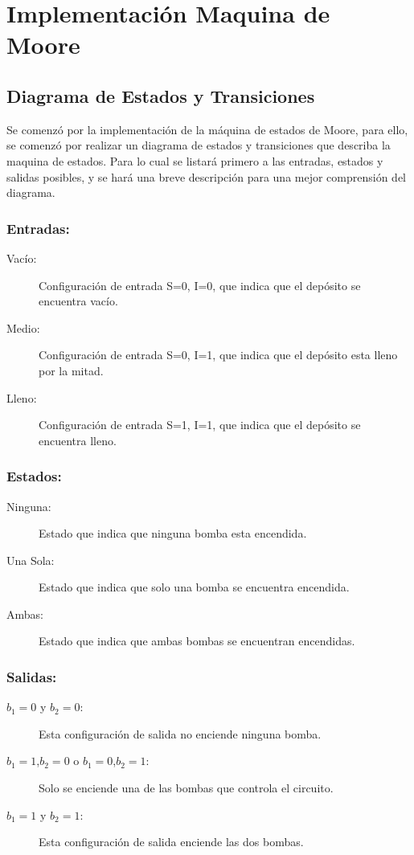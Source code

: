 \documentclass[10pt,a4paper]{article}
\begin{document}
\section*{Implementación Maquina de Moore}
\subsection*{Diagrama de Estados y Transiciones}

Se comenzó por la implementación de la máquina de estados de Moore, para ello, se comenzó por realizar un diagrama de estados y transiciones que describa la maquina de estados. Para lo cual se listará primero a las entradas, estados y salidas posibles, y se hará una breve descripción para una mejor comprensión del diagrama.

\subsubsection*{Entradas:}

\begin{description}
\item[Vacío:] Configuración de entrada S=0, I=0, que indica que el depósito se encuentra vacío.
\item[Medio:] Configuración de entrada S=0, I=1, que indica que el depósito esta lleno por la mitad.
\item[Lleno:] Configuración de entrada S=1, I=1, que indica que el depósito se encuentra lleno.
\end{description}

\subsubsection*{Estados:}

\begin{description}
\item[Ninguna:] Estado que indica que ninguna bomba esta encendida.
\item[Una Sola:] Estado que indica que solo una bomba se encuentra encendida.
\item[Ambas:] Estado que indica que ambas bombas se encuentran encendidas.
\end{description}

\subsubsection*{Salidas:}

\begin{description}
\item[$b_1=0$ y $b_2=0$:] Esta configuración de salida no enciende ninguna bomba.
\item[$b_1=1$,$b_2=0$ o $b_1=0$,$b_2=1$:] Solo se enciende una de las bombas que controla el circuito.
\item[$b_1=1$ y $b_2=1$:] Esta configuración de salida enciende las dos bombas.
\end{description}
\end{document}
